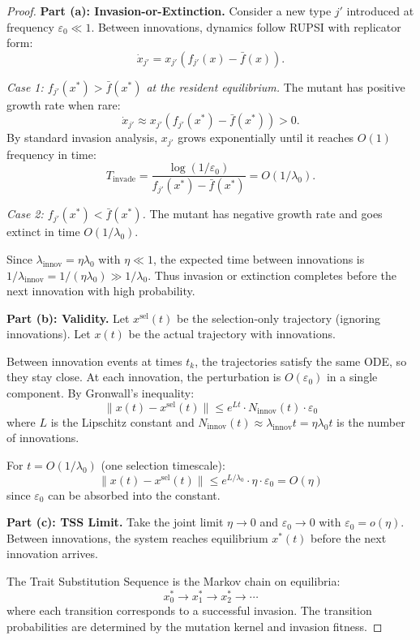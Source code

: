 \documentclass[12pt]{article}
\begin{document}
\begin{proof}
\textbf{Part (a): Invasion-or-Extinction.}
Consider a new type $j'$ introduced at frequency $\varepsilon_0 \ll 1$. Between innovations, dynamics follow RUPSI with replicator form:
\[
\dot{x}_{j'} = x_{j'} (f_{j'}(x) - \bar{f}(x)).
\]

\textit{Case 1: $f_{j'}(x^*) > \bar{f}(x^*)$ at the resident equilibrium.}
The mutant has positive growth rate when rare:
\[
\dot{x}_{j'} \approx x_{j'} (f_{j'}(x^*) - \bar{f}(x^*)) > 0.
\]
By standard invasion analysis, $x_{j'}$ grows exponentially until it reaches $O(1)$ frequency in time:
\[
T_{\text{invade}} = \frac{\log(1/\varepsilon_0)}{f_{j'}(x^*) - \bar{f}(x^*)} = O(1/\lambda_0).
\]

\textit{Case 2: $f_{j'}(x^*) < \bar{f}(x^*)$.}
The mutant has negative growth rate and goes extinct in time $O(1/\lambda_0)$.

Since $\lambda_{\text{innov}} = \eta \lambda_0$ with $\eta \ll 1$, the expected time between innovations is $1/\lambda_{\text{innov}} = 1/(\eta \lambda_0) \gg 1/\lambda_0$. Thus invasion or extinction completes before the next innovation with high probability.

\textbf{Part (b): Validity.}
Let $x^{\text{sel}}(t)$ be the selection-only trajectory (ignoring innovations). Let $x(t)$ be the actual trajectory with innovations.

Between innovation events at times $t_k$, the trajectories satisfy the same ODE, so they stay close. At each innovation, the perturbation is $O(\varepsilon_0)$ in a single component. By Gronwall's inequality:
\[
\|x(t) - x^{\text{sel}}(t)\| \leq e^{Lt} \cdot N_{\text{innov}}(t) \cdot \varepsilon_0
\]
where $L$ is the Lipschitz constant and $N_{\text{innov}}(t) \approx \lambda_{\text{innov}} t = \eta \lambda_0 t$ is the number of innovations.

For $t = O(1/\lambda_0)$ (one selection timescale):
\[
\|x(t) - x^{\text{sel}}(t)\| \leq e^{L/\lambda_0} \cdot \eta \cdot \varepsilon_0 = O(\eta)
\]
since $\varepsilon_0$ can be absorbed into the constant.

\textbf{Part (c): TSS Limit.}
Take the joint limit $\eta \to 0$ and $\varepsilon_0 \to 0$ with $\varepsilon_0 = o(\eta)$. Between innovations, the system reaches equilibrium $x^*(t)$ before the next innovation arrives.

The Trait Substitution Sequence is the Markov chain on equilibria:
\[
x^*_0 \to x^*_1 \to x^*_2 \to \cdots
\]
where each transition corresponds to a successful invasion. The transition probabilities are determined by the mutation kernel and invasion fitness.


\end{proof}
\end{document}

